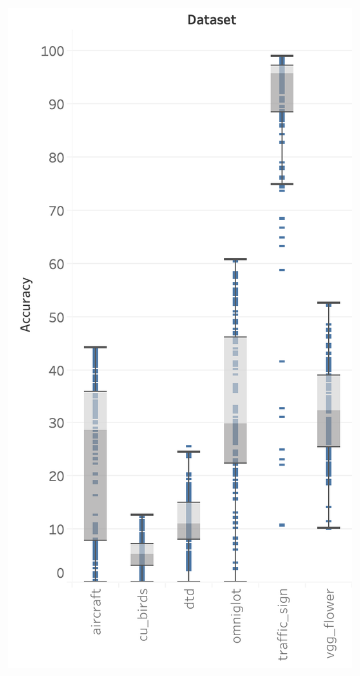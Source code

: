 \begin{figure}[ht]
\centering
\begin{subfigure}{.5\textwidth}
  \centering
      \includegraphics[width=0.8\linewidth]{imgs/boxplot-accuracies.png}
  \caption{}
  \label{fig:appA:boxplot}
\end{subfigure}%
\begin{subfigure}{.5\textwidth}
  \centering

\end{subfigure}
\end{figure}

